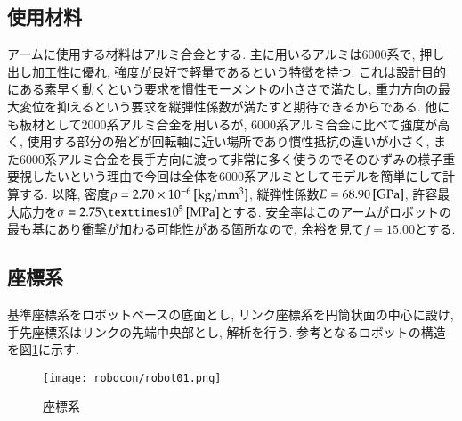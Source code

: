 \documentclass[10pt,b5paper,papersize,dvipdfmx]{jsbook}
\begin{document}
\subsection{使用材料}
アームに使用する材料はアルミ合金とする. 主に用いるアルミは6000系で, 押し出し加工性に優れ, 強度が良好で軽量であるという特徴を持つ. これは設計目的にある素早く動くという要求を慣性モーメントの小ささで満たし, 重力方向の最大変位を抑えるという要求を縦弾性係数が満たすと期待できるからである. 他にも板材として2000系アルミ合金を用いるが, 6000系アルミ合金に比べて強度が高く, 使用する部分の殆どが回転軸に近い場所であり慣性抵抗の違いが小さく, また6000系アルミ合金を長手方向に渡って非常に多く使うのでそのひずみの様子重要視したいという理由で今回は全体を6000系アルミとしてモデルを簡単にして計算する. 以降, 密度$\rho=2.70\times 10^{-6}\tani*{kg/mm^3}$, 縦弾性係数$E=68.90 \tani*{GPa}$, 許容最大応力を$\sigma=2.75×10^{5} \tani*{MPa}$とする. 安全率はこのアームがロボットの最も基にあり衝撃が加わる可能性がある箇所なので, 余裕を見て$f=15.00$とする.
\subsection{座標系}\label{座標系}
基準座標系をロボットベースの底面とし, リンク座標系を円筒状面の中心に設け, 手先座標系はリンクの先端中央部とし, 解析を行う. 参考となるロボットの構造を図\ref{fig:座標系}に示す. 
\begin{figure}[htbp]
  \centering
  \texttt{[image: robocon/robot01.png]}
  \caption{座標系}
  \label{fig:座標系}
\end{figure}
\end{document}
